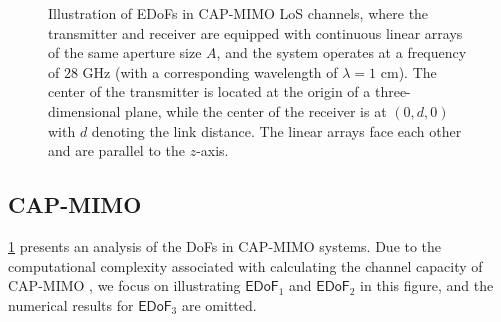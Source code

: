 \documentclass[journal]{IEEEtran}
\theoremstyle{definition}
\begin{document}
\begin{figure}[!t]
    \centering
    \subfigbottomskip=0pt
    \setlength{\abovecaptionskip}{0pt}
\caption{Illustration of EDoFs in CAP-MIMO LoS channels, where the transmitter and receiver are equipped with continuous linear arrays of the same aperture size $A$, and the system operates at a frequency of $28$ GHz (with a corresponding wavelength of $\lambda=1$ cm). The center of the transmitter is located at the origin of a three-dimensional plane, while the center of the receiver is at $(0,d,0)$ with $d$ denoting the link distance. The linear arrays face each other and are parallel to the $z$-axis.}
\label{figure_CAP_EDoF}
\vspace{-10pt}
\end{figure}


\subsection{CAP-MIMO}
{\figurename} {\ref{figure_CAP_EDoF}} presents an analysis of the DoFs in CAP-MIMO systems. Due to the computational complexity associated with calculating the channel capacity of CAP-MIMO \cite{Wan2023}, we focus on illustrating ${\mathsf{EDoF}}_1$ and ${\mathsf{EDoF}}_2$ in this figure, and the numerical results for ${\mathsf{EDoF}}_3$ are omitted.
\end{document}
